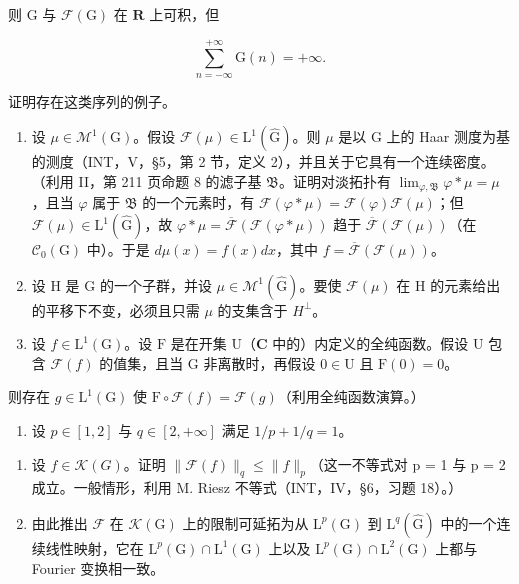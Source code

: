 则 G 与 \(\mathcal{F}(\mathrm{G})\) 在 \(\mathbf{R}\) 上可积，但

\[
\sum_ {n = - \infty} ^ {+ \infty} \mathrm{G} (n) = + \infty .
\]

证明存在这类序列的例子。

\begin{enumerate}
\def\labelenumi{\arabic{enumi})}
\setcounter{enumi}{4}
\item
  设 \(\mu \in \mathcal{M}^1 (\mathrm{G})\)。假设 \(\mathcal{F}(\mu)\in \mathrm{L}^1 (\widehat{\mathrm{G}})\)。则 \(\mu\) 是以 G 上的 Haar 测度为基的测度（INT，V，§5，第 2 节，定义 2），并且关于它具有一个连续密度。（利用 II，第 211 页命题 8 的滤子基 \(\mathfrak{B}\)。证明对淡拓扑有 \(\lim_{\varphi ,\mathfrak{B}}\varphi *\mu = \mu\)，且当 \(\varphi\) 属于 \(\mathfrak{B}\) 的一个元素时，有 \(\mathcal{F}(\varphi *\mu) = \mathcal{F}(\varphi)\mathcal{F}(\mu)\)；但 \(\mathcal{F}(\mu)\in \mathrm{L}^1 (\widehat{\mathrm{G}})\)，故 \(\varphi *\mu = \overline{\mathcal{F}} (\mathcal{F}(\varphi *\mu))\) 趋于 \(\overline{\mathcal{F}} (\mathcal{F}(\mu))\)（在 \(\mathcal{C}_0(\mathrm{G})\) 中）。于是 \(d\mu (x) = f(x)dx\)，其中 \(f = \overline{\mathcal{F}} (\mathcal{F}(\mu))\)。
\item
  设 H 是 G 的一个子群，并设 \(\mu \in \mathcal{M}^{1}(\widehat{\mathrm{G}})\)。要使 \(\mathcal{F}(\mu)\) 在 H 的元素给出的平移下不变，必须且只需 \(\mu\) 的支集含于 \(H^{\perp}\)。
\item
  设 \(f \in \mathrm{L}^1(\mathrm{G})\)。设 \(\mathrm{F}\) 是在开集 \(\mathrm{U}\)（\(\mathbf{C}\) 中的）内定义的全纯函数。假设 \(\mathrm{U}\) 包含 \(\mathcal{F}(f)\) 的值集，且当 \(\mathrm{G}\) 非离散时，再假设 \(0 \in \mathrm{U}\) 且 \(\mathrm{F}(0) = 0\)。
\end{enumerate}

则存在 \(g \in \mathrm{L}^{1}(\mathrm{G})\) 使 \(\mathrm{F} \circ \mathcal{F}(f) = \mathcal{F}(g)\)（利用全纯函数演算。）

\begin{enumerate}
\def\labelenumi{\arabic{enumi})}
\setcounter{enumi}{7}
\tightlist
\item
  设 \(p \in [1,2]\) 与 \(q \in [2, +\infty]\) 满足 \(1/p + 1/q = 1\)。
\end{enumerate}

\begin{enumerate}
\def\labelenumi{\alph{enumi})}
\item
  设 \(f \in \mathcal{K}(G)\)。证明 \(\|\mathcal{F}(f)\|_{q} \leqslant \|f\|_{p}\)（这一不等式对 p = 1 与 p = 2 成立。一般情形，利用 M. Riesz 不等式（INT，IV，§6，习题 18）。）
\item
  由此推出 \(\mathcal{F}\) 在 \(\mathcal{K}(\mathrm{G})\) 上的限制可延拓为从 \(\mathrm{L}^p (\mathrm{G})\) 到 \(\mathrm{L}^q (\widehat{\mathrm{G}})\) 中的一个连续线性映射，它在 \(\mathrm{L}^p (\mathrm{G})\cap \mathrm{L}^1 (\mathrm{G})\) 上以及 \(\mathrm{L}^p (\mathrm{G})\cap \mathrm{L}^2 (\mathrm{G})\) 上都与 Fourier 变换相一致。
\end{enumerate}

